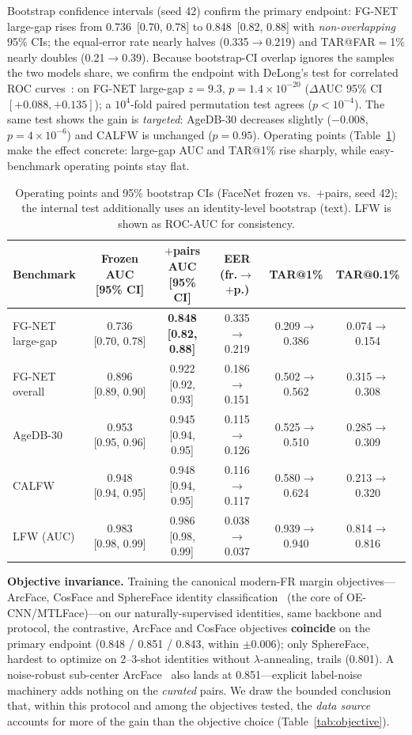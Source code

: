 \documentclass[letterpaper]{article} %
\begin{document}
Bootstrap confidence intervals (seed 42) confirm the primary endpoint: FG-NET large-gap rises from 0.736~[0.70, 0.78] to 0.848~[0.82, 0.88] with \emph{non-overlapping} 95\% CIs; the equal-error rate nearly halves (0.335$\to$0.219) and TAR@FAR$=$1\% nearly doubles (0.21$\to$0.39). Because bootstrap-CI overlap ignores the samples the two models share, we confirm the endpoint with DeLong's test for correlated ROC curves~\cite{delong1988}: on FG-NET large-gap $z=9.3$, $p=1.4\times10^{-20}$ ($\Delta$AUC 95\% CI $[+0.088,+0.135]$); a $10^4$-fold paired permutation test agrees ($p<10^{-4}$). The same test shows the gain is \emph{targeted}: AgeDB-30 decreases slightly ($-$0.008, $p=4\times10^{-6}$) and CALFW is unchanged ($p=0.95$). Operating points (Table~\ref{tab:stats}) make the effect concrete: large-gap AUC and TAR@1\% rise sharply, while easy-benchmark operating points stay flat.

\begin{table}[t]
\centering
\small
\begin{tabular}{@{}lccccc@{}}
\toprule
Benchmark & Frozen AUC [95\% CI] & $+$pairs AUC [95\% CI] & EER (fr.$\to$$+$p.) & TAR@1\% & TAR@0.1\% \\
\midrule
FG-NET large-gap & 0.736 [0.70, 0.78] & \textbf{0.848 [0.82, 0.88]} & 0.335$\to$0.219 & 0.209$\to$0.386 & 0.074$\to$0.154 \\
FG-NET overall & 0.896 [0.89, 0.90] & 0.922 [0.92, 0.93] & 0.186$\to$0.151 & 0.502$\to$0.562 & 0.315$\to$0.308 \\
AgeDB-30 & 0.953 [0.95, 0.96] & 0.945 [0.94, 0.95] & 0.115$\to$0.126 & 0.525$\to$0.510 & 0.285$\to$0.309 \\
CALFW & 0.948 [0.94, 0.95] & 0.948 [0.94, 0.95] & 0.116$\to$0.117 & 0.580$\to$0.624 & 0.213$\to$0.320 \\
LFW (AUC) & 0.983 [0.98, 0.99] & 0.986 [0.98, 0.99] & 0.038$\to$0.037 & 0.939$\to$0.940 & 0.814$\to$0.816 \\
\bottomrule
\end{tabular}
\caption{Operating points and 95\% bootstrap CIs (FaceNet frozen vs.\ $+$pairs, seed 42); the internal test additionally uses an identity-level bootstrap (text). LFW is shown as ROC-AUC for consistency.}
\label{tab:stats}
\end{table}

\textbf{Objective invariance.} Training the canonical modern-FR margin objectives---ArcFace, CosFace and SphereFace identity classification~\cite{deng2019arcface} (the core of OE-CNN/MTLFace)---on our naturally-supervised identities, same backbone and protocol, the contrastive, ArcFace and CosFace objectives \textbf{coincide} on the primary endpoint (0.848 / 0.851 / 0.843, within $\pm$0.006); only SphereFace, hardest to optimize on 2--3-shot identities without $\lambda$-annealing, trails (0.801). A noise-robust sub-center ArcFace~\cite{deng2020subcenter} also lands at 0.851---explicit label-noise machinery adds nothing on the \emph{curated} pairs. We draw the bounded conclusion that, within this protocol and among the objectives tested, the \emph{data source} accounts for more of the gain than the objective choice (Table~\ref{tab:objective}).
\end{document}
